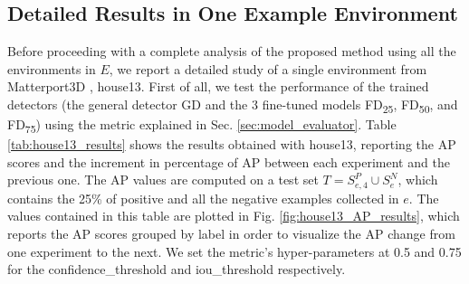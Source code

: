 \subsection{Detailed Results in One Example Environment}

Before proceeding with a complete analysis of the proposed method using all the environments in $E$, we report a detailed study of a single environment from Matterport3D \cite{matterport}, \textsf{house13}. First of all, we test the performance of the trained detectors (the general detector \textsf{GD} and the 3 fine-tuned models \textsf{FD\textsubscript{25}}, \textsf{FD\textsubscript{50}}, and \textsf{FD\textsubscript{75}}) using the metric explained in Sec. \ref{sec:model_evaluator}. Table \ref{tab:house13_results} shows the results obtained with \textsf{house13}, reporting the AP scores and the increment in percentage of AP between each experiment and the previous one. The AP values are computed on a test set $T = S^{P}_{e, 4} \cup S^{N}_{e}$, which contains the 25\% of positive and all the negative examples collected in $e$. The values contained in this table are plotted in Fig. \ref{fig:house13_AP_results}, which reports the AP scores grouped by label in order to visualize the AP change from one experiment to the next. We set the metric's hyper-parameters at 0.5 and 0.75 for the \textsf{confidence\_threshold} and \textsf{iou\_threshold} respectively.

